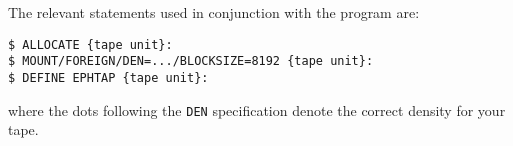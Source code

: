 \documentclass[twoside,11pt]{article}
\renewcommand{\_}{\texttt{\symbol{95}}}
\begin{document}
The relevant statements used in conjunction with the program are:
\begin{verbatim}
$ ALLOCATE {tape unit}:
$ MOUNT/FOREIGN/DEN=.../BLOCKSIZE=8192 {tape unit}:
$ DEFINE EPHTAP {tape unit}:
\end{verbatim}
where the dots following the {\tt DEN} specification denote the correct
density for your tape.


\end{document}
